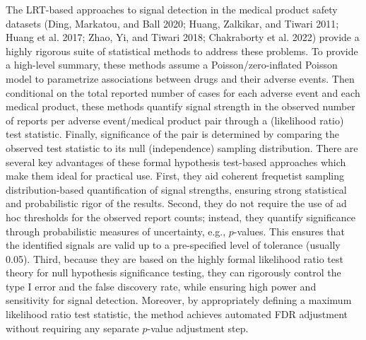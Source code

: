 The LRT-based approaches to signal detection in the medical product safety datasets (Ding, Markatou, and Ball 2020; Huang, Zalkikar, and Tiwari 2011; Huang et al. 2017; Zhao, Yi, and Tiwari 2018; Chakraborty et al. 2022) provide a highly rigorous suite of statistical methods to address these problems. To provide a high-level summary, these methods assume a Poisson/zero-inflated Poisson model to parametrize associations between drugs and their adverse events. Then conditional on the total reported number of cases for each adverse event and each medical product, these methods quantify signal strength in the observed number of reports per adverse event/medical product pair through a (likelihood ratio) test statistic. Finally, significance of the pair is determined by comparing the observed test statistic to its null (independence) sampling distribution. There are several key advantages of these formal hypothesis test-based approaches which make them ideal for practical use. First, they aid coherent frequetist sampling distribution-based quantification of signal strengths, ensuring strong statistical and probabilistic rigor of the results. Second, they do not require the use of ad hoc thresholds for the observed report counts; instead, they quantify significance through probabilistic measures of uncertainty, e.g., \(p\)-values. This ensures that the identified signals are valid up to a pre-specified level of tolerance (usually 0.05). Third, because they are based on the highly formal likelihood ratio test theory for null hypothesis significance testing, they can rigorously control the type I error and the false discovery rate, while ensuring high power and sensitivity for signal detection. Moreover, by appropriately defining a maximum likelihood ratio test statistic, the method achieves automated FDR adjustment without requiring any separate \(p\)-value adjustment step.

